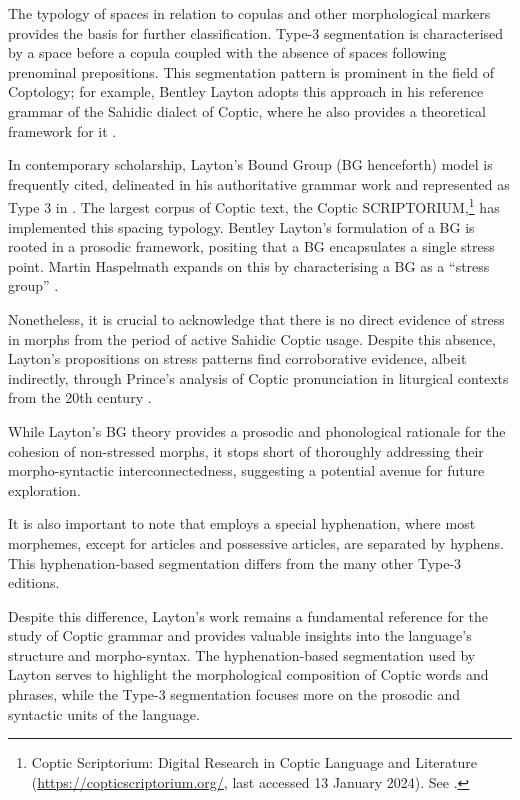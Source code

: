 \documentclass[output=paper,colorlinks,citecolor=brown ,chinesefont]{langscibook}
\begin{document}
The typology of spaces in relation to copulas and other morphological markers provides the basis for further classification. Type-3 segmentation is characterised by a space before a copula coupled with the absence of spaces following prenominal prepositions. This segmentation pattern is prominent in the field of Coptology; for example, Bentley Layton adopts this approach in his reference grammar of the Sahidic dialect of Coptic, where he also provides a theoretical framework for it \citep[25--26]{layton1}.

In contemporary scholarship, Layton’s Bound Group (BG henceforth) model is frequently cited, delineated in his authoritative grammar work and represented as Type 3 in . The largest corpus of Coptic text, the Coptic SCRIPTORIUM,\footnote{Coptic Scriptorium: Digital Research in Coptic Language and Literature (\url{https://copticscriptorium.org/}, last accessed 13 January 2024). See \citet{schroederzeldes}.}  has implemented this spacing typology. Bentley Layton’s formulation of a BG is rooted in a prosodic framework, positing that a BG encapsulates a single stress point. Martin Haspelmath expands on this by characterising a BG as a “stress group” \citep{haspelmath}.

Nonetheless, it is crucial to acknowledge that there is no direct evidence of stress in morphs from the period of active Sahidic Coptic usage. Despite this absence, Layton's propositions on stress patterns find corroborative evidence, albeit indirectly, through Prince's analysis of Coptic pronunciation in liturgical contexts from the 20th century \citep{prince}. 

While Layton's BG theory provides a prosodic and phonological rationale for the cohesion of non-stressed morphs, it stops short of thoroughly addressing their morpho-syntactic interconnectedness, suggesting a potential avenue for future exploration.

It is also important to note that \citet{layton1} employs a special hyphenation, where most morphemes, except for articles and possessive articles, are separated by hyphens. This hyphenation-based segmentation differs from the many other Type-3 editions.

Despite this difference, Layton's work remains a fundamental reference for the study of Coptic grammar and provides valuable insights into the language's structure and morpho-syntax. The hyphenation-based segmentation used by Layton serves to highlight the morphological composition of Coptic words and phrases, while the Type-3 segmentation focuses more on the prosodic and syntactic units of the language.
\end{document}
